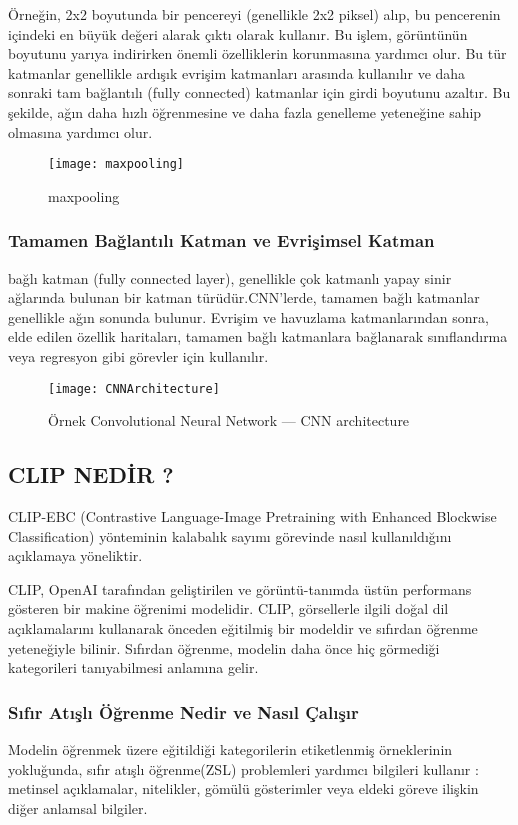 \documentclass[10pt,a4paper]{report}
\begin{document}
\begin{justify}
		
	Örneğin, 2x2 boyutunda bir pencereyi (genellikle 2x2 piksel) alıp, bu pencerenin içindeki en büyük değeri alarak çıktı olarak kullanır. Bu işlem, görüntünün boyutunu yarıya indirirken önemli özelliklerin korunmasına yardımcı olur. Bu tür katmanlar genellikle ardışık evrişim katmanları arasında kullanılır ve daha sonraki tam bağlantılı (fully connected) katmanlar için girdi boyutunu azaltır. Bu şekilde, ağın daha hızlı öğrenmesine ve daha fazla genelleme yeteneğine sahip olmasına yardımcı olur.
	\begin{figure}[!h]
		\centering
		\texttt{[image: maxpooling]}
		\caption{maxpooling \cite{bozkurt2021cnn}}
		\label{maxpooling}
	\end{figure}
	
	\subsubsection{Tamamen Bağlantılı Katman ve Evrişimsel Katman}
	
	bağlı katman (fully connected layer), genellikle çok katmanlı yapay sinir ağlarında bulunan bir katman türüdür.CNN'lerde, tamamen bağlı katmanlar genellikle ağın sonunda bulunur. Evrişim ve havuzlama katmanlarından sonra, elde edilen özellik haritaları, tamamen bağlı katmanlara bağlanarak sınıflandırma veya regresyon gibi görevler için kullanılır.\newline
	
	\begin{figure}[!h]
		\centering
		\texttt{[image: CNNArchitecture]}
		\caption{ Örnek Convolutional Neural Network — CNN architecture \cite{shahriar2023cnn}}
		\label{CNNArchitecture}
	\end{figure}
	
	
	\subsection{CLIP NEDİR ?}
	CLIP-EBC (Contrastive Language-Image Pretraining with Enhanced Blockwise Classification) yönteminin kalabalık sayımı görevinde nasıl kullanıldığını açıklamaya yöneliktir.
	
	CLIP, OpenAI tarafından geliştirilen ve görüntü-tanımda üstün performans gösteren bir makine öğrenimi modelidir. CLIP, görsellerle ilgili doğal dil açıklamalarını kullanarak önceden eğitilmiş bir modeldir ve sıfırdan öğrenme yeteneğiyle bilinir. Sıfırdan öğrenme, modelin daha önce hiç görmediği kategorileri tanıyabilmesi anlamına gelir.
	\subsubsection{Sıfır Atışlı Öğrenme Nedir ve Nasıl Çalışır}
	Modelin öğrenmek üzere eğitildiği kategorilerin etiketlenmiş örneklerinin yokluğunda, sıfır atışlı öğrenme(ZSL) problemleri yardımcı bilgileri kullanır : metinsel açıklamalar, nitelikler, gömülü gösterimler veya eldeki göreve ilişkin diğer anlamsal bilgiler.\newline
	

\end{justify}
\end{document}
